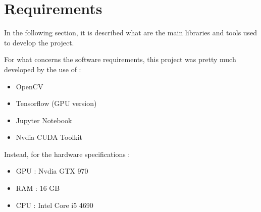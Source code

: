 \section{Requirements}

\begin{flushleft}
In the following section, it is described what are the main libraries and tools used to develop the project. 

For what concerns the software requirements, this project was pretty much developed by the use of :
\begin{itemize}
    \item OpenCV
    \item Tensorflow (GPU version) 
    \item Jupyter Notebook
    \item Nvdia CUDA Toolkit
\end{itemize}

Instead, for the hardware specifications :
\begin{itemize}
    \item GPU : Nvdia GTX 970
    \item RAM : 16 GB
    \item CPU : Intel Core i5 4690
\end{itemize}
\end{flushleft}